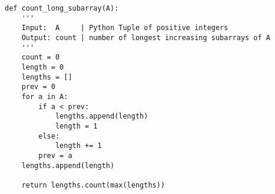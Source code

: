 \documentclass[12pt,twoside]{article}
\begin{document}
\begin{problems}
\problem  %

\begin{lstlisting}
def count_long_subarray(A):
    '''
    Input:  A     | Python Tuple of positive integers
    Output: count | number of longest increasing subarrays of A
    '''
    count = 0
    length = 0
    lengths = []
    prev = 0
    for a in A:
        if a < prev:
            lengths.append(length)
            length = 1
        else:
            length += 1
        prev = a
    lengths.append(length)
    
    return lengths.count(max(lengths))

\end{lstlisting}

\end{problems}
\end{document}
